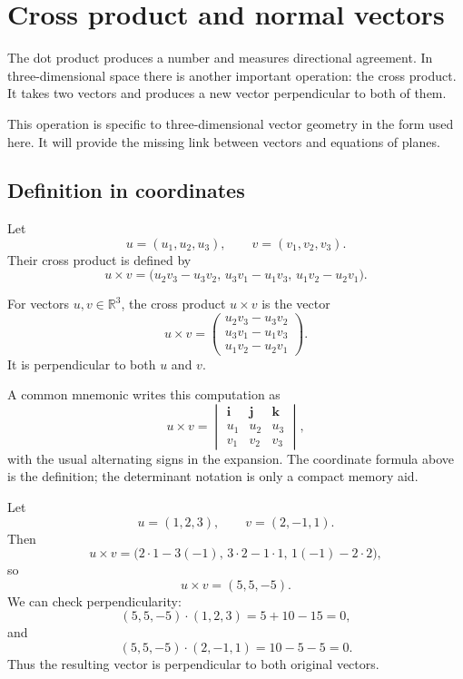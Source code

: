 \section{Cross product and normal vectors}

The dot product produces a number and measures directional agreement. In three-dimensional space there is another important operation: the cross product. It takes two vectors and produces a new vector perpendicular to both of them.

This operation is specific to three-dimensional vector geometry in the form used here. It will provide the missing link between vectors and equations of planes.

\subsection*{Definition in coordinates}

Let
\[
u=(u_1,u_2,u_3),
\qquad
v=(v_1,v_2,v_3).
\]
Their cross product is defined by
\[
u\times v
=
\bigl(
u_2v_3-u_3v_2,\,
u_3v_1-u_1v_3,\,
u_1v_2-u_2v_1
\bigr).
\]

\begin{definitionbox}
For vectors \(u,v\in\mathbb{R}^3\), the cross product \(u\times v\) is the vector
\[
u\times v
=
\begin{pmatrix}
u_2v_3-u_3v_2\\
u_3v_1-u_1v_3\\
u_1v_2-u_2v_1
\end{pmatrix}.
\]
It is perpendicular to both \(u\) and \(v\).
\end{definitionbox}

A common mnemonic writes this computation as
\[
u\times v=
\begin{vmatrix}
\mathbf{i}&\mathbf{j}&\mathbf{k}\\
u_1&u_2&u_3\\
v_1&v_2&v_3
\end{vmatrix},
\]
with the usual alternating signs in the expansion. The coordinate formula above is the definition; the determinant notation is only a compact memory aid.

\begin{examplebox}
Let
\[
u=(1,2,3),
\qquad
v=(2,-1,1).
\]
Then
\[
u\times v
=
\bigl(
2\cdot1-3(-1),\,
3\cdot2-1\cdot1,\,
1(-1)-2\cdot2
\bigr),
\]
so
\[
u\times v=(5,5,-5).
\]
We can check perpendicularity:
\[
(5,5,-5)\cdot(1,2,3)=5+10-15=0,
\]
and
\[
(5,5,-5)\cdot(2,-1,1)=10-5-5=0.
\]
Thus the resulting vector is perpendicular to both original vectors.
\end{examplebox}

